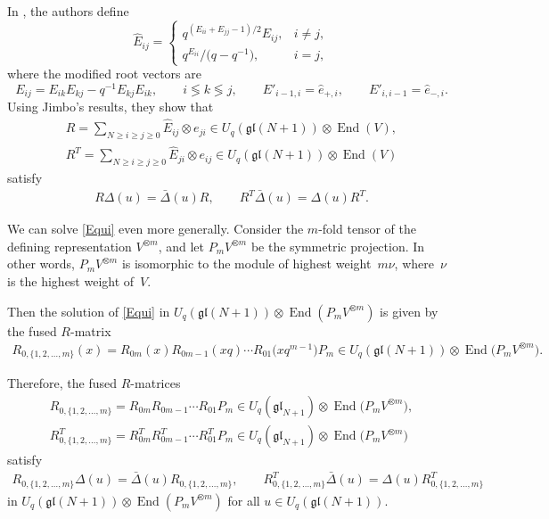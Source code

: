 \documentclass[pdftex]{sigma}
\numberwithin{equation}{section}
\DeclareMathOperator{\End}{End}
\newcommand{\Uqgl}{{U_q(\mathfrak{gl}(N+1))}}
\begin{document}
In \cite{GZB}, the authors define
\[
\hat{E}_{ij}
=
\begin{cases}
q^{(E_{ii}+E_{jj}-1)/2}E_{ij}, & i \neq j,\\
q^{E_{ii}}/\big(q-q^{-1}\big), & i=j,
\end{cases}
\]
where the modified root vectors are
\begin{equation*}
E_{ij}= E_{ik}E_{kj} -q^{- 1} E_{kj}E_{ik},\qquad i \lessgtr k \lessgtr j, \qquad E'_{i-1,i} = \hat{e}_{+,i}, \qquad E'_{i,i-1} = \hat{e}_{-,i}.
\end{equation*}
Using Jimbo's results, they show that
\begin{gather*}
R = \sum_{N \geq i\geq j \geq 0} \hat{E}_{ij} \otimes e_{ji} \in \Uqgl \otimes \End (V),\nonumber\\
R^T = \sum_{N \geq i\geq j \geq 0} \hat{E}_{ji} \otimes e_{ij} \in \Uqgl \otimes \End (V) %
\end{gather*}
satisfy
\begin{gather*}
R\Delta(u) = \bar{\Delta}(u) R,\qquad
R^T\bar{\Delta}(u) = {\Delta}(u) R^T.
\end{gather*}

We can solve \eqref{Equi} even more generally. Consider the $ m $-fold tensor of the defining representation $ V^{\otimes m}$, and let $P_mV^{\otimes m}$ be the symmetric projection. In other words, $P_mV^{\otimes m}$ is isomorphic to the module of highest weight~$m\nu$, where~$\nu$ is the highest weight of~$V$.

Then the solution of \eqref{Equi} in $ \Uqgl \otimes \End (P_m V^{\otimes m}) $ is given by the fused $R$-matrix~\cite{Jimbo1986}%
\begin{gather*} %
R^{}_{0,\{1,2,\dots,m\}}(x)= R_{0m}(x)R_{0m-1}(xq) \cdots R_{01}\big(xq^{ m-1}\big) P_m \in \Uqgl\otimes \End \big(P_m V^{\otimes m}\big) .
\end{gather*}

Therefore, the fused $R$-matrices
\begin{gather*}
R^{}_{0,\{1,2,\dots,m\}} = R_{0m}R_{0m-1}\cdots R_{01}P_m \in U_q(\mathfrak{gl}_{N+1})\otimes \End \big(P_m V^{\otimes m}\big), \\
R^{T}_{0,\{1,2,\dots,m\}} = R^T_{0m}R^T_{0m-1}\cdots R^T_{01}P_m \in U_q(\mathfrak{gl}_{N+1})\otimes \End \big(P_m V^{\otimes m}\big)
\end{gather*}
satisfy
\begin{gather}
R_{0,\{1,2,\dots,m\}} \Delta(u) = \bar{\Delta}(u) R_{0,\{1,2,\dots,m\} },\qquad
R^T_{0,\{1,2,\dots,m\}} \bar{\Delta}(u) = {\Delta}(u) R^T_{0,\{1,2,\dots,m\}}\label{RRel}
\end{gather}
in $\Uqgl \otimes \End (P_m V^{\otimes m})$ for all $u\in \Uqgl$.
\end{document}
